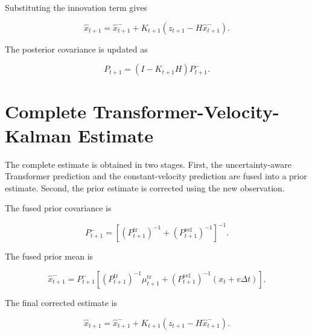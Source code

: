 \documentclass[a4paper]{article}
\begin{document}
        Substituting the innovation term gives
        
        \[
            \hat{x}_{t+1}
            =
            \hat{x}_{t+1}^{-}
            +
            K_{t+1}
            \left(
                z_{t+1}
                -
                H\hat{x}_{t+1}^{-}
            \right).
        \]
        
        The posterior covariance is updated as
        
        \[
            P_{t+1}
            =
            \left(
                I
                -
                K_{t+1}H
            \right)
            P_{t+1}^{-}.
        \]
    
    
    \section{Complete Transformer-Velocity-Kalman Estimate}
        
        The complete estimate is obtained in two stages. First, the uncertainty-aware Transformer prediction and the constant-velocity prediction are fused into a prior estimate. Second, the prior estimate is corrected using the new observation.
        
        The fused prior covariance is
        
        \[
            P_{t+1}^{-}
            =
            \left[
                \left(
                    P_{t+1}^{\mathrm{tr}}
                \right)^{-1}
                +
                \left(
                    P_{t+1}^{\mathrm{vel}}
                \right)^{-1}
            \right]^{-1}.
        \]
        
        The fused prior mean is
        
        \[
            \hat{x}_{t+1}^{-}
            =
            P_{t+1}^{-}
            \left[
                \left(
                    P_{t+1}^{\mathrm{tr}}
                \right)^{-1}
                \mu_{t+1}^{\mathrm{tr}}
                +
                \left(
                    P_{t+1}^{\mathrm{vel}}
                \right)^{-1}
                \left(
                    x_t
                    +
                    v\Delta t
                \right)
            \right].
        \]
        
        The final corrected estimate is
        
        \[
            \hat{x}_{t+1}
            =
            \hat{x}_{t+1}^{-}
            +
            K_{t+1}
            \left(
                z_{t+1}
                -
                H\hat{x}_{t+1}^{-}
            \right).
        \]
        
\end{document}
